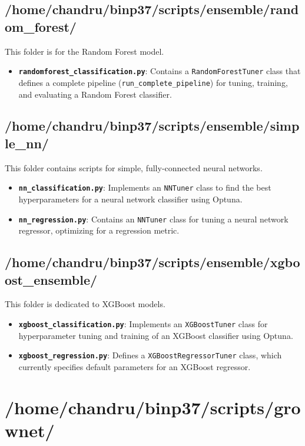 \documentclass{article}
\begin{document}
\subsection*{/home/chandru/binp37/scripts/ensemble/random\_forest/}
This folder is for the Random Forest model.
\begin{itemize}
    \item \textbf{\texttt{randomforest\_classification.py}}: Contains a \texttt{RandomForestTuner} class that defines a complete pipeline (\texttt{run\_complete\_pipeline}) for tuning, training, and evaluating a Random Forest classifier.
\end{itemize}

\subsection*{/home/chandru/binp37/scripts/ensemble/simple\_nn/}
This folder contains scripts for simple, fully-connected neural networks.
\begin{itemize}
    \item \textbf{\texttt{nn\_classification.py}}: Implements an \texttt{NNTuner} class to find the best hyperparameters for a neural network classifier using Optuna.
    \item \textbf{\texttt{nn\_regression.py}}: Contains an \texttt{NNTuner} class for tuning a neural network regressor, optimizing for a regression metric.
\end{itemize}

\subsection*{/home/chandru/binp37/scripts/ensemble/xgboost\_ensemble/}
This folder is dedicated to XGBoost models.
\begin{itemize}
    \item \textbf{\texttt{xgboost\_classification.py}}: Implements an \texttt{XGBoostTuner} class for hyperparameter tuning and training of an XGBoost classifier using Optuna.
    \item \textbf{\texttt{xgboost\_regression.py}}: Defines a \texttt{XGBoostRegressorTuner} class, which currently specifies default parameters for an XGBoost regressor.
\end{itemize}

\section*{/home/chandru/binp37/scripts/grownet/}
\end{document}
